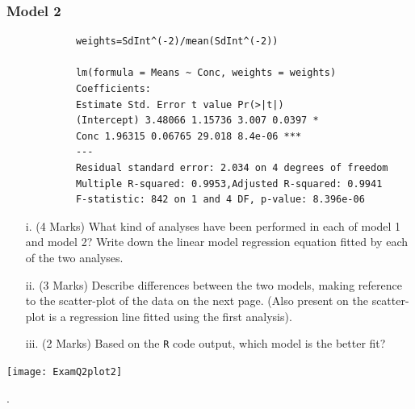 \documentclass[a4paper,12pt]{article}
\begin{document}
		\subsubsection*{Model 2}
		\begin{framed}
		
			\begin{verbatim}
			weights=SdInt^(-2)/mean(SdInt^(-2))
			
			lm(formula = Means ~ Conc, weights = weights)
			Coefficients:
			Estimate Std. Error t value Pr(>|t|)
			(Intercept) 3.48066 1.15736 3.007 0.0397 *
			Conc 1.96315 0.06765 29.018 8.4e-06 ***
			---
			Residual standard error: 2.034 on 4 degrees of freedom
			Multiple R-squared: 0.9953,Adjusted R-squared: 0.9941
			F-statistic: 842 on 1 and 4 DF, p-value: 8.396e-06
			\end{verbatim}
		\end{framed}
	\begin{itemize}
		\item[i.] (4 Marks) What kind of analyses have been performed in each of model 1 and model 2? Write down the linear model regression equation fitted by each of the two analyses.
		
		\item[ii.] (3 Marks) Describe differences between the two models, making reference to the scatter-plot of the data on the next page. (Also present on the scatter-plot is a regression line fitted using the first analysis).
		\item[iii.] (2 Marks) Based on the \texttt{R} code output, which model is the better fit?
	\end{itemize}
	\newpage
	\begin{center}
		\texttt{[image: ExamQ2plot2]}
	\end{center}.
\newpage
\end{document}
